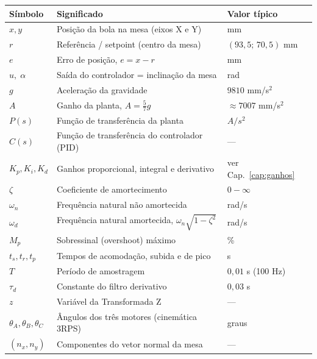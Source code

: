 \begingroup
\renewcommand{\arraystretch}{1.3}
\begin{longtable}{>{\bfseries}l >{\RaggedRight\arraybackslash}p{10.5cm} l}
\toprule
S\'imbolo & Significado & Valor t\'ipico \\
\midrule\endhead
$x,y$        & Posi\c{c}\~ao da bola na mesa (eixos X e Y) & mm \\
$r$          & Refer\^encia / setpoint (centro da mesa) & $(93{,}5;\,70{,}5)$ mm \\
$e$          & Erro de posi\c{c}\~ao, $e = x - r$ & mm \\
$u,\;\alpha$ & Sa\'ida do controlador = inclina\c{c}\~ao da mesa & rad \\
$g$          & Acelera\c{c}\~ao da gravidade & $9810$ mm/s$^2$ \\
$A$          & Ganho da planta, $A=\tfrac{5}{7}g$ & $\approx 7007$ mm/s$^2$ \\
$P(s)$       & Fun\c{c}\~ao de transfer\^encia da planta & $A/s^2$ \\
$C(s)$       & Fun\c{c}\~ao de transfer\^encia do controlador (PID) & --- \\
$K_p,K_i,K_d$& Ganhos proporcional, integral e derivativo & ver Cap.~\ref{cap:ganhos} \\
$\zeta$      & Coeficiente de amortecimento & $0\!-\!\infty$ \\
$\omega_n$   & Frequ\^encia natural n\~ao amortecida & rad/s \\
$\omega_d$   & Frequ\^encia natural amortecida, $\omega_n\sqrt{1-\zeta^2}$ & rad/s \\
$M_p$        & Sobressinal (overshoot) m\'aximo & \% \\
$t_s,t_r,t_p$& Tempos de acomoda\c{c}\~ao, subida e de pico & s \\
$T$          & Per\'iodo de amostragem & $0{,}01$ s (100 Hz) \\
$\tau_d$     & Constante do filtro derivativo & $0{,}03$ s \\
$z$          & Vari\'avel da Transformada Z & --- \\
$\theta_A,\theta_B,\theta_C$ & \^Angulos dos tr\^es motores (cinem\'atica 3RPS) & graus \\
$(n_x,n_y)$  & Componentes do vetor normal da mesa & --- \\
\bottomrule
\end{longtable}
\endgroup

\mainmatter

